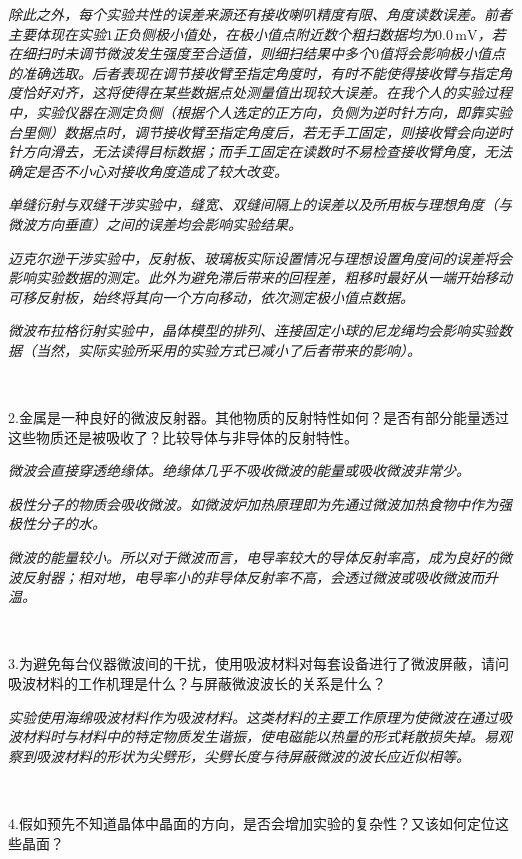 \documentclass[UTF-8,twoside,cs4size]{ctexart}
\begin{document}
		\textit{除此之外，每个实验共性的误差来源还有接收喇叭精度有限、角度读数误差。前者主要体现在实验$ 1 $正负侧极小值处，在极小值点附近数个粗扫数据均为$ 0.0\,\mathrm{mV} $，若在细扫时未调节微波发生强度至合适值，则细扫结果中多个$ 0 $值将会影响极小值点的准确选取。后者表现在调节接收臂至指定角度时，有时不能使得接收臂与指定角度恰好对齐，这将使得在某些数据点处测量值出现较大误差。在我个人的实验过程中，实验仪器在测定负侧（根据个人选定的正方向，负侧为逆时针方向，即靠实验台里侧）数据点时，调节接收臂至指定角度后，若无手工固定，则接收臂会向逆时针方向滑去，无法读得目标数据；而手工固定在读数时不易检查接收臂角度，无法确定是否不小心对接收角度造成了较大改变。}
		
		\textit{单缝衍射与双缝干涉实验中，缝宽、双缝间隔上的误差以及所用板与理想角度（与微波方向垂直）之间的误差均会影响实验结果。}
		
		\textit{迈克尔逊干涉实验中，反射板、玻璃板实际设置情况与理想设置角度间的误差将会影响实验数据的测定。此外为避免滞后带来的回程差，粗移时最好从一端开始移动可移反射板，始终将其向一个方向移动，依次测定极小值点数据。}
		
		\textit{微波布拉格衍射实验中，晶体模型的排列、连接固定小球的尼龙绳均会影响实验数据（当然，实际实验所采用的实验方式已减小了后者带来的影响）。}
		
		~\
		
	\noindent2.金属是一种良好的微波反射器。其他物质的反射特性如何？是否有部分能量透过这些物质还是被吸收了？比较导体与非导体的反射特性。
	
		\textit{微波会直接穿透绝缘体。绝缘体几乎不吸收微波的能量或吸收微波非常少。}
		
		\textit{极性分子的物质会吸收微波。如微波炉加热原理即为先通过微波加热食物中作为强极性分子的水。}
		
		\textit{微波的能量较小。所以对于微波而言，电导率较大的导体反射率高，成为良好的微波反射器；相对地，电导率小的非导体反射率不高，会透过微波或吸收微波而升温。}
		
	~\
		
	\noindent3.为避免每台仪器微波间的干扰，使用吸波材料对每套设备进行了微波屏蔽，请问吸波材料的工作机理是什么？与屏蔽微波波长的关系是什么？
	
	\textit{实验使用海绵吸波材料作为吸波材料。这类材料的主要工作原理为使微波在通过吸波材料时与材料中的特定物质发生谐振，使电磁能以热量的形式耗散损失掉。易观察到吸波材料的形状为尖劈形，尖劈长度与待屏蔽微波的波长应近似相等。}
	
	~\
	
	\noindent4.假如预先不知道晶体中晶面的方向，是否会增加实验的复杂性？又该如何定位这些晶面？
	
\end{document}
